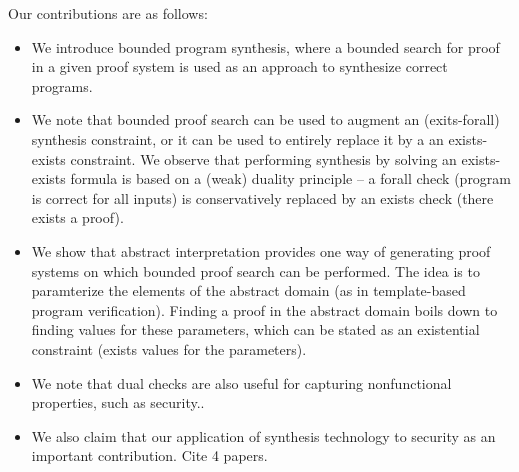 \documentclass[preprint]{sig-alternate-05-2015}
\newcommand\ignore[1]{{}}
\begin{document}
\ignore{
In the usual notion of types, we have types
representing a set of concrete values.
We wish to go beyond this standard notion and
consider arbitrary user-defined entities that
behave like types, but that are not necessarily
related in any way to the concrete semantics of the program.
Let us call this more general notion {\em{dual values}}.
So, a program variable will be mapped to not only a value,
as in the usual semantics of programs, but also
simultaneously to a dual value.
Moreover, as in the case of types, 
this dual value does not correspond to
the result of a particular execution, 
but to a property that holds in every execution.
A user can not only program how values are updated
in a program, but also program the rules that govern
the update of dual values. 

%
The obvious question to ask here is why should one be
interested in programmable dual values and the dual
semantics that govern their behavior.
There are three main reasons:
(1) it provides a framework for using types-like 
constraints to prune search space in 
program synthesis, (2) it enables specification of
nonfunctional properties, and (3) it provides a new
way to think about program analysis and synthesis,
and helps provide theoretical clarity in that space.

\endignore}

Our contributions are as follows:
\begin{itemize}
  \item We  introduce bounded program synthesis, where
    a bounded search for proof in a given proof system 
    is used as an approach to synthesize correct programs.
  \item We note that bounded proof search can be used to
    augment an (exits-forall) synthesis constraint, or 
    it can be used to entirely replace it by a an
    exists-exists constraint.  We observe that performing
    synthesis by solving an exists-exists formula is 
    based on a (weak) duality principle -- a forall check
    (program is correct for all inputs) is conservatively 
    replaced 
    by an exists check (there exists a proof).
  \item We show that abstract interpretation provides one
    way of generating proof systems on which bounded proof
    search can be performed.  The idea is to paramterize
    the elements of the abstract domain (as in template-based
    program verification). Finding a proof in the abstract
    domain boils down to finding values for these parameters,
    which can be stated as an existential constraint (exists
    values for the parameters).
  \item We note that dual checks are also useful for capturing
    nonfunctional properties, such as security..
  \item
We also claim that our application of synthesis technology
to security as an important contribution.
Cite 4 papers.
\end{itemize}
\end{document}
